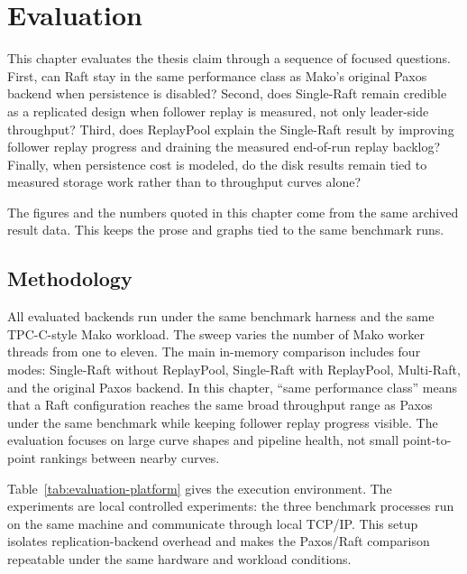 \chapter{Evaluation}

This chapter evaluates the thesis claim through a sequence of focused
questions. First, can Raft stay in the same performance class as Mako's
original Paxos backend when persistence is disabled? Second, does Single-Raft
remain credible as a replicated design when follower replay is measured, not
only leader-side throughput? Third, does ReplayPool explain the Single-Raft
result by improving follower replay progress and draining the measured
end-of-run replay backlog? Finally, when persistence cost is modeled, do the
disk results remain tied to measured storage work rather than to throughput
curves alone?

The figures and the numbers quoted in this chapter come from the same archived
result data. This keeps the prose and graphs tied to the same benchmark runs.

\section{Methodology}

All evaluated backends run under the same benchmark harness and the same
TPC-C-style Mako workload. The sweep varies the number of Mako worker threads
from one to eleven. The main in-memory comparison includes four modes:
Single-Raft without ReplayPool, Single-Raft with ReplayPool, Multi-Raft, and
the original Paxos backend. In this chapter, ``same performance class'' means
that a Raft configuration reaches the same broad throughput range as Paxos
under the same benchmark while keeping follower replay progress visible. The
evaluation focuses on large curve shapes and pipeline health, not small
point-to-point rankings between nearby curves.

Table~\ref{tab:evaluation-platform} gives the execution environment. The
experiments are local controlled experiments: the three benchmark processes run
on the same machine and communicate through local TCP/IP. This setup isolates
replication-backend overhead and makes the Paxos/Raft comparison repeatable
under the same hardware and workload conditions.

